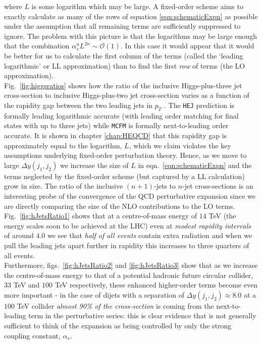 		where $L$ is some logarithm which may be large.  A fixed-order scheme aims to exactly calculate as many of the rows of equation
		\eqref{eqn:schematicExpn} as possible under the assumption that all remaining terms are sufficiently suppressed to ignore.  The problem with this
		picture is that the logarithms may be large enough that the combination $\alpha_s^nL^{2n}\sim\mathcal{O}(1)$.  In this case it would appear
		that it would be better for us to calculate the first column of the terms (called the `leading logarithmic' or LL
		approximation) than to find the first \emph{row} of terms (the LO approximation).\\Fig.~\eqref{fig:higgsratios} shows how
		the ratio of the inclusive Higgs-plus-three jet cross-section to inclusive Higgs-plus-two jet cross-section varies as
		a function of the rapidity gap between the two leading jets in $p_T$ \cite{jeppeTalk}.  The \texttt{HEJ} prediction is formally leading logarithmic
		accurate (with leading order matching for final states with up to three jets) while \texttt{MCFM} is formally next-to-leading order
		accurate.  It is shown in chapter \ref{chap:HEQCD} that this rapidity gap is approximately equal to the logarithm, $L$, which
		we claim violates the key assumptions underlying fixed-order perturbation theory.  Hence, as we move to large $\Delta y(j_1, j_2)$
		we increase the size of $L$ in eqn.~\eqref{eqn:schematicExpn} and the terms neglected by the fixed-order scheme (but captured by a
		LL calculation) grow in size.  The ratio of the inclusive $(n+1)$-jets to $n$-jet cross-sections is an interesting probe of the
		convergence of the QCD perturbative expansion since we are directly comparing the size of the NLO contributions to the LO terms.
		Fig.~\eqref{fig:hJetsRatio1} shows that at a centre-of-mass energy of $14$ TeV (the energy scales soon to be achieved at the LHC)
		even at \emph{modest rapidity intervals} of around $4.0$ we see that \emph{half of all events} contain extra radiation and when we pull the leading
		jets apart further in rapidity this increases to three quarters of all events.\\ Furthermore, figs.~\eqref{fig:hJetsRatio2} and
		\eqref{fig:hJetsRatio3} show that as we increase the centre-of-mass energy to that of a potential hadronic future circular
		collider, $33$ TeV and $100$ TeV respectively, these enhanced higher-order terms become even more important - in the case
		of dijets with a separation of $\Delta y(j_1, j_2)\approx8.0$ at a $100$ TeV collider \emph{almost 90\% of the cross-section} is
		coming from the next-to-leading term in the perturbative series: this is clear evidence that is not generally sufficient to think
		of the expansion as being controlled by only the strong coupling constant, $\alpha_s$.

